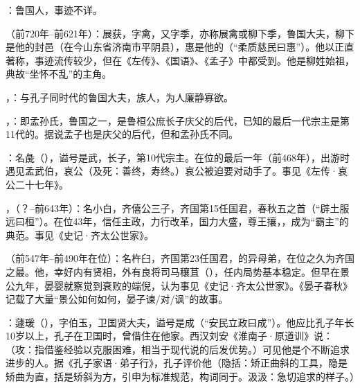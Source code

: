 ：鲁国人，事迹不详。%

（前720年--前621年）：展获，字禽，又字季，亦称展禽或柳下季，鲁国大夫，柳下是他的封邑（在今山东省济南市平阴县），惠是他的（“柔质慈民曰惠”）。他以正直著称，事迹流传较少，但在《左传》、《国语》、《孟子》中都受到。他是柳姓始祖，典故“坐怀不乱”的主角。

，：与孔子同时代的鲁国大夫，族人，为人廉静寡欲。

，：即孟孙氏，鲁国之一，是鲁桓公庶长子庆父的后代，已知的最后一代宗主是第11代的。据说孟子也是庆父的后代，但和孟孙氏不同。

：名彘（），谥号是武，长子，第10代宗主。在位的最后一年（前468年），出游时遇见孟武伯，哀公（及死：善终，寿终。）哀公被迫要对动手了。事见《左传·哀公二十七年》。

，（？--前643年）：名小白，齐僖公三子，齐国第15任国君，春秋五之首（“辟土服远曰桓”）。在位43年，信任主政，力行改革，国力大盛，尊王攘，，成为“霸主”的典范。事见《史记·齐太公世家》。

（前547年--前490年在位）：名杵臼，齐国第23任国君，的异母弟，在位之久为齐国之最。他，幸好内有贤相，外有良将司马穰苴（），任内局势基本稳定。但早在景公九年，晏婴就察觉到衰败的端倪，认为事见《史记·齐太公世家》。《晏子春秋》记载了大量“景公如何如何，晏子谏/对/讽”的故事。

：蘧瑗（），字伯玉，卫国贤大夫，谥号是成（“安民立政曰成”）。他应比孔子年长10岁以上，孔子在卫国时，曾借住在他家。西汉刘安《淮南子·原道训》说：（攻：指借鉴经验以克服困难，相当于现代说的后发优势。）可见他是个不断追求进步的人。据《孔子家语·弟子行》，孔子评价他（隐括：矫正曲斜的工具，隐是矫曲为直，括是矫斜为方，引申为标准规范，构词同于。汲汲：急切追求的样子。）

